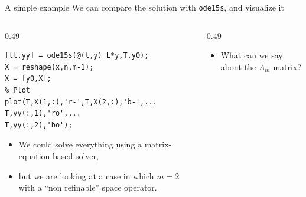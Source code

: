 \documentclass[aspectratio=169,xcolor=dvipsnames]{beamer}
\begin{document}
\begin{frame}[fragile]{A simple example}
We can compare the solution with \texttt{ode15s}, and visualize it
\begin{columns}
\begin{column}{0.49\columnwidth}
\begin{verbatim}
[tt,yy] = ode15s(@(t,y) L*y,T,y0);
X = reshape(x,n,m-1);
X = [y0,X];
% Plot
plot(T,X(1,:),'r-',T,X(2,:),'b-',...
T,yy(:,1),'ro',...
T,yy(:,2),'bo');
\end{verbatim}
\vspace{-1em}\begin{itemize}
	\item[\faBinoculars]<2-> We could solve everything using a matrix-equation based solver,
	\item[\faHammer]<3-> but we are looking at a case in which $m = 2$ with a ``non refinable'' space operator.
\end{itemize}

\end{column}
\begin{column}{0.49\columnwidth}
\centering



\begin{itemize}
	\item[\faHammer]<4-> What can we say about the $A_m$ matrix?
\end{itemize}

\end{column}
\end{columns}

\end{frame}
\end{document}
